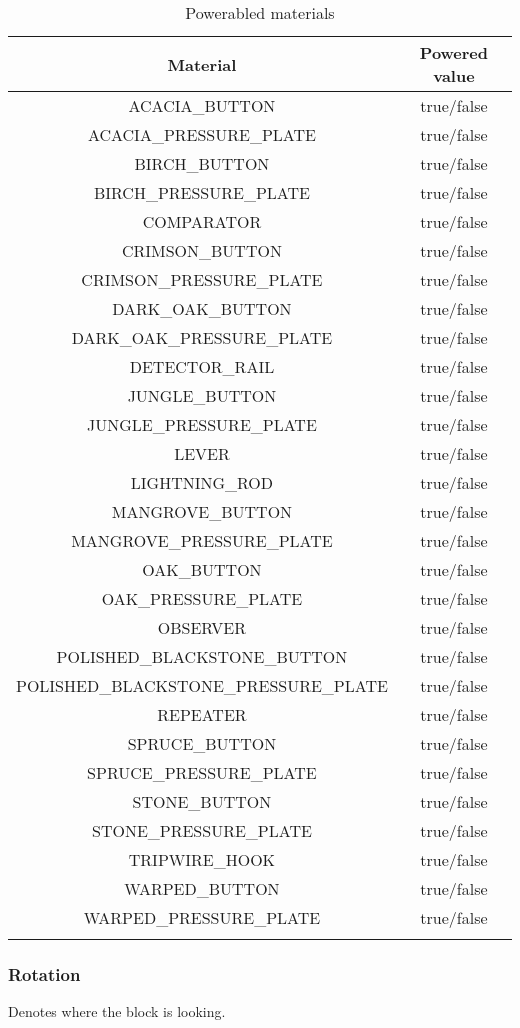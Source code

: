 \begin{longtable}{ |c|c| }
	\hline
	Material & Powered value \\
	\hline
	\endhead
	ACACIA\_BUTTON & true/false \\
	ACACIA\_PRESSURE\_PLATE & true/false \\
	BIRCH\_BUTTON & true/false \\
	BIRCH\_PRESSURE\_PLATE & true/false \\
	COMPARATOR & true/false \\
	CRIMSON\_BUTTON & true/false \\
	CRIMSON\_PRESSURE\_PLATE & true/false \\
	DARK\_OAK\_BUTTON & true/false \\
	DARK\_OAK\_PRESSURE\_PLATE & true/false \\
	DETECTOR\_RAIL & true/false \\
	JUNGLE\_BUTTON & true/false \\
	JUNGLE\_PRESSURE\_PLATE & true/false \\
	LEVER & true/false \\
	LIGHTNING\_ROD & true/false \\
	MANGROVE\_BUTTON & true/false \\
	MANGROVE\_PRESSURE\_PLATE & true/false \\
	OAK\_BUTTON & true/false \\
	OAK\_PRESSURE\_PLATE & true/false \\
	OBSERVER & true/false \\
	POLISHED\_BLACKSTONE\_BUTTON & true/false \\
	POLISHED\_BLACKSTONE\_PRESSURE\_PLATE & true/false \\
	REPEATER & true/false \\
	SPRUCE\_BUTTON & true/false \\
	SPRUCE\_PRESSURE\_PLATE & true/false \\
	STONE\_BUTTON & true/false \\
	STONE\_PRESSURE\_PLATE & true/false \\
	TRIPWIRE\_HOOK & true/false \\
	WARPED\_BUTTON & true/false \\
	WARPED\_PRESSURE\_PLATE & true/false \\
	\hline
	\caption{Powerabled materials}
\end{longtable}

\subsubsection{Rotation}\label{spigot-types:rotation}
Denotes where the block is looking.

